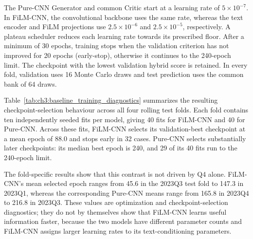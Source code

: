 The Pure-CNN Generator and common Critic start at a learning rate of $5\times10^{-7}$. In FiLM-CNN, the convolutional backbone uses the same rate, whereas the text encoder and FiLM projections use $2.5\times10^{-6}$ and $2.5\times10^{-5}$, respectively. A plateau scheduler reduces each learning rate towards its prescribed floor. After a minimum of 30 epochs, training stops when the validation criterion has not improved for 20 epochs (early-stop), otherwise it continues to the 240-epoch limit. The checkpoint with the lowest validation hybrid score is retained. In every fold, validation uses 16 Monte Carlo draws and test prediction uses the common bank of 64 draws.


Table~\ref{tab:ch3:baseline_training_diagnostics} summarizes the resulting
checkpoint-selection behaviour across all four rolling test folds. Each fold
contains ten independently seeded fits per model, giving 40 fits for FiLM-CNN
and 40 for Pure-CNN. Across these fits, FiLM-CNN selects its validation-best
checkpoint at a mean epoch of 88.0 and stops early in 32 cases. Pure-CNN
selects substantially later checkpoints: its median best epoch is 240, and 29
of its 40 fits run to the 240-epoch limit.

The fold-specific results show that this contrast is not driven by Q4 alone.
FiLM-CNN's mean selected epoch ranges from 45.6 in the 2023Q3 test fold to
147.3 in 2023Q1, whereas the corresponding Pure-CNN means range from 165.8 in
2023Q4 to 216.8 in 2023Q3. These values are optimization and
checkpoint-selection diagnostics; they do not by themselves show that
FiLM-CNN learns useful information faster, because the two models have
different parameter counts and FiLM-CNN assigns larger learning rates to its
text-conditioning parameters.

